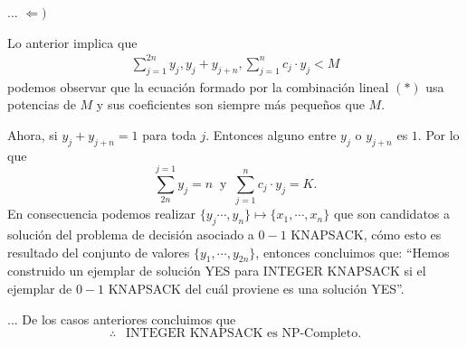 \begin{frame}{...}
  $\Leftarrow )$ \newline

  Lo anterior implica que
  \begin{eqnarray*}
    \sum_{j = 1}^{2n}y_j, y_j + y_{j + n}, \sum_{j = 1}^{n} c_j\cdot y_j < M
  \end{eqnarray*}
  podemos observar que la ecuación formado por la combinación lineal $(*)$ usa
  potencias de $M$ y sus coeficientes son siempre más pequeños que $M$.\newline

  Ahora, si $y_j + y_{j + n} = 1$ para toda $j$. Entonces alguno entre $y_j$ o $y_{j + n}$
  es $1$. Por lo que
  \[\sum_{2n}^{j = 1}y_j = n\ \text{ y }\ \sum_{j = 1}^{n}c_j \cdot y_j = K.\]
  En consecuencia podemos realizar $\{y_j \dotsm, y_{n}\} \mapsto \{x_1, \dotsm, x_n\}$
  que son candidatos a solución del problema de decisión asociado a $0-1$ KNAPSACK, cómo
  esto es resultado del conjunto de valores $\{y_1, \dotsm, y_{2n}\}$, entonces concluimos
  que: ``Hemos construido un ejemplar de solución YES para INTEGER KNAPSACK si el
  ejemplar de $0-1$ KNAPSACK del cuál proviene es una solución YES''.
\end{frame}

\begin{frame}{...}
  De los casos anteriores concluimos que
   \[\therefore\ \ \text{ INTEGER KNAPSACK es NP-Completo.}\]
\end{frame}
